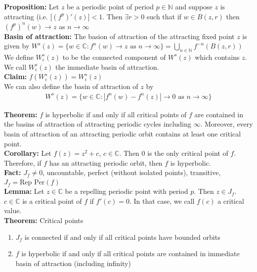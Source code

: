 \documentclass[12pt]{article}
\begin{document}
\textbf{Proposition:} Let $z$ be a periodic point of period $p \in \mathbb{N}$ and suppose $z$ is attracting (i.e. $|(f^p)'(z)| < 1$. Then $\exists r > 0$ such that if $w \in B(z, r)$ then $(f^p)^n(w) \to z$ as $n \to \infty$\\

\textbf{Basin of attraction:} The basion of attraction of the attracting fixed point $z$ is given by $W^s(z) = \{w \in \mathbb{C}: f^n(w) \to z \text{ as } n \to \infty\} = \bigcup_{n \in \mathbb{N}} f^{-n}(B(z, r))$\\

We define $W_{\epsilon}^s(z)$ to be the connected component of $W^s(z)$ which contains $z$. We call $W_{\epsilon}^s(z)$ the immediate basin of attraction.\\

\textbf{Claim:} $f(W_{\epsilon}^s(z)) = W^s_{\epsilon}(z)$\\

We can also define the basin of attraction of $z$ by
\begin{align*}
W^s(z) = \{w \in \mathbb{C}: |f^n(w) - f^n(z)| \to 0 \text{ as } n \to \infty\}
\end{align*}

\textbf{Theorem:} $f$ is hyperbolic if and only if all critical points of $f$ are contained in the basins of attraction of attracting periodic cycles including $\infty$. Moreover, every basin of attraction of an attracting periodic orbit contains at least one critical point.\\

\textbf{Corollary:} Let $f(z) = z^2 + c$, $c \in \mathbb{C}$. Then $0$ is the only critical point of $f$. Therefore, if $f$ has an attracting periodic orbit, then $f$ is hyperbolic.\\

\textbf{Fact:} $J_f \neq 0$, uncountable, perfect (without isolated points), transitive, $J_f = \overline{\text{Rep Per}(f)}$\\

\textbf{Lemma:} Let $z \in \mathbb{C}$ be a repelling periodic point with period $p$. Then $z \in J_f$.\\

$c \in \mathbb{C}$ is a critical point of $f$ if $f'(c) = 0$. In that case, we call $f(c)$ a critical value.\\

\textbf{Theorem:} Critical points
\begin{enumerate}[label=(\alph*)]

\item $J_f$ is connected if and only if all critical points have bounded orbits

\item $f$ is hyperbolic if and only if all critical points are contained in immediate basin of attraction (including infinity)

\end{enumerate}
\end{document}
